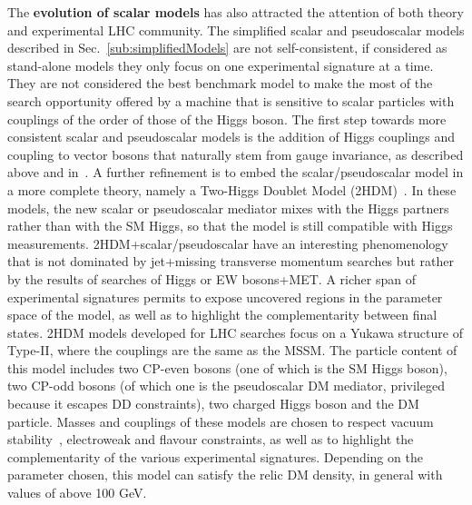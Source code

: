 

The \textbf{evolution of scalar models} has also attracted the attention of both theory and experimental LHC community. The simplified scalar and pseudoscalar models described in Sec.~\ref{sub:simplifiedModels} are not self-consistent, if considered as stand-alone models they only focus on one experimental signature at a time. They are not considered the best benchmark model to make the most of %
the search opportunity offered by a machine that is sensitive to scalar particles with couplings of the order of those of the Higgs boson.
The first step towards more consistent scalar and pseudoscalar models is the addition of Higgs couplings and coupling to vector bosons that naturally stem from gauge invariance, as described above and in~\cite{Bauer:2016gys,Berlin:2014cfa}. A further refinement is to embed the scalar/pseudoscalar model in a more complete theory, namely a Two-Higgs Doublet Model (2HDM)~\cite{Bauer:2017ota,Ipek:2014gua,No:2015xqa,Goncalves:2016iyg,Bell:2016ekl}. 
In these models, the new scalar or pseudoscalar mediator mixes with the Higgs partners rather than with the SM Higgs, so that the model is still compatible with Higgs measurements. 2HDM+scalar/pseudoscalar have an interesting phenomenology that is not dominated by jet+missing transverse momentum searches but rather by the results of searches of Higgs or EW bosons+MET. A richer span of experimental signatures permits to expose uncovered regions in the parameter space of the model, as well as to highlight the complementarity between final states. 2HDM models developed for LHC searches focus on a Yukawa structure of Type-II, where the couplings are the same as the MSSM. The particle content of this model includes two CP-even bosons (one of which is the SM Higgs boson), two CP-odd bosons (of which one is the pseudoscalar DM mediator, privileged because it escapes DD constraints), two charged Higgs boson and the DM particle. Masses and couplings of these models are chosen to respect vacuum stability~\cite{No:2015xqa}, electroweak and flavour constraints, as well as to highlight the complementarity of the various experimental signatures. Depending on the parameter chosen, this model can satisfy the relic DM density, in general with values of \mdm above 100 GeV.   

